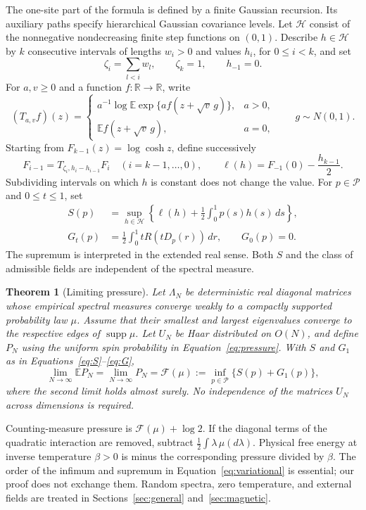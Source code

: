 \documentclass[11pt]{article}
\newtheorem{theorem}{Theorem}[section]
\theoremstyle{definition}
\theoremstyle{remark}
\numberwithin{equation}{section}
\newcommand{\R}{\mathbb R}
\newcommand{\E}{\mathbb E}
\newcommand{\cP}{\mathcal P}
\newcommand{\cH}{\mathcal H}
\DeclareMathOperator{\supp}{supp}
\begin{document}
The one-site part of the formula is defined by a finite Gaussian recursion.
Its auxiliary paths specify hierarchical Gaussian covariance levels.
Let $\cH$ consist of the nonnegative nondecreasing finite step functions
on $(0,1)$. Describe $h\in\cH$ by $k$ consecutive intervals of lengths
$w_i>0$ and values $h_i$, for $0\le i<k$, and set
\[
 \zeta_i=\sum_{l<i}w_l,\qquad \zeta_k=1,
 \qquad h_{-1}=0.
\]
For $a,v\ge0$ and a function $f:\R\to\R$, write
\[
 (T_{a,v}f)(z)=
 \begin{cases}
 a^{-1}\log\E\exp\{a f(z+\sqrt v\,g)\},&a>0,\\
 \E f(z+\sqrt v\,g),&a=0,
 \end{cases}
 \qquad g\sim N(0,1).
\]
Starting from $F_{k-1}(z)=\log\cosh z$, define successively
\begin{equation}
 F_{i-1}=T_{\zeta_i,h_i-h_{i-1}}F_i
 \quad (i=k-1,\ldots,0),\qquad
 \ell(h)=F_{-1}(0)-\frac{h_{k-1}}2.
 \label{eq:field-recursion}
\end{equation}
Subdividing intervals on which $h$ is constant does not change the value.
For $p\in\cP$ and $0\le t\le1$, set
\begin{align}
 S(p)&=\sup_{h\in\cH}
 \left\{\ell(h)+\frac12\int_0^1p(s)h(s)\,ds\right\},
 \label{eq:S}\\
 G_t(p)&=\frac12\int_0^1tR(tD_p(r))\,dr,
 \qquad G_0(p)=0.
 \label{eq:G}
\end{align}
The supremum is interpreted in the extended real sense. Both $S$ and the
class of admissible fields are independent of the spectral measure.

\begin{theorem}[Limiting pressure]\label{thm:main}
Let $\Lambda_N$ be deterministic real diagonal matrices whose empirical
spectral measures converge weakly to a compactly supported probability
law $\mu$. Assume that their smallest and largest eigenvalues converge
to the respective edges of $\supp\mu$. Let $U_N$ be Haar distributed
on $O(N)$, and define $P_N$ using the uniform spin probability in
Equation~\eqref{eq:pressure}. With $S$ and $G_1$ as in
Equations~\eqref{eq:S}--\eqref{eq:G},
\begin{equation}
 \lim_{N\to\infty}\E P_N
 =\lim_{N\to\infty}P_N
 =\mathcal F(\mu)
 :=\inf_{p\in\cP}\{S(p)+G_1(p)\},
 \label{eq:variational}
\end{equation}
where the second limit holds almost surely. No independence of the
matrices $U_N$ across dimensions is required.
\end{theorem}

Counting-measure pressure is $\mathcal F(\mu)+\log2$. If the diagonal
terms of the quadratic interaction are removed, subtract
$\tfrac12\int\lambda\,\mu(d\lambda)$. Physical free energy at inverse
temperature $\beta>0$ is minus the corresponding pressure divided by
$\beta$. The order of the infimum and supremum in
Equation~\eqref{eq:variational} is essential; our proof does not exchange
them. Random spectra, zero temperature, and external fields are treated
in Sections~\ref{sec:general} and~\ref{sec:magnetic}.
\end{document}
